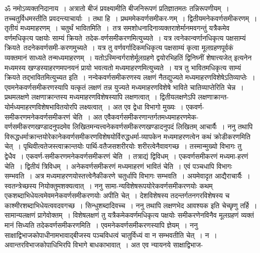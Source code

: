 \documentclass[11pt, openany]{book}
\begin{document}
\begin{sloppypar}
ॐ नमोऽव्यक्तनिदानाय~। अत्रातो बीजं प्रवक्ष्यामीति बीजनिरूपणं प्रतिज्ञातमतः तन्निरूपणीयम्~। तच्चतुर्विधमस्तीति प्रवदन्त्याचार्याः~। तथा हि~। प्रथममेकवर्णसमीकर-णम्~। द्वितीयमनेकवर्णसमीकरणम्~। तृतीयं मध्यमाहरणम्~। चतुर्थं भावितमिति~।~तत्र समशोधनादिनाव्यक्तराशेर्मानमवगन्तुं यत्रैकमेव वर्णमधिकृत्य पक्षयोः साम्यं क्रियते~तदेक-वर्णसमीकरणमित्युच्यते~। यत्र त्वनेकान्वर्णानधिकृत्य पक्षसाम्यं क्रियते~तदनेकवर्णसमी-करणमुच्यते~। यत्र तु वर्णवर्गादिकमधिकृत्य पक्षसाम्यं कृत्वा मूलग्रहणपूर्वकं व्यक्तमानं साध्यते तन्मध्यमाहरणम्~। यतोऽस्मिन्वर्गराशेर्मूलग्रहणे द्वयोरभिहतिं द्विनिघ्नीं शेषात्त्यजेत् इत्यनेन मध्यमस्य खण्डस्याहरणमपनयनं प्रायो भवत्यतो मध्यमाहरणमित्युच्यते~। यत्र तु भावितमधिकृत्य साम्यं क्रियते तद्भावितमित्युच्यत इति~। नन्वेकवर्णसमीकरणस्य लक्षणं नैतद्युज्यते मध्यमाहरणविशेषेऽतिव्याप्तेः~। एवमनेकवर्णसमीकरणस्यापि यत्कृतं लक्षणं तन्न युज्यते मध्यमाहरणविशेषे भाविते चातिव्याप्तेरिति चेन्न~। प्रथमलक्षणे लक्षणाक्रान्तस्य मध्यमाहरणविशेषस्यापि लक्षणत्वात्~। द्वितीयलक्षणेऽपि लक्षणाक्रान्त-योर्मध्यमाहरणविशेषभावितयोरपि लक्ष्यत्वात्~। अत एव द्वेधा विभागो मुख्यः~। एकवर्ण-समीकरणमनेकवर्णसमीकरणं चेति~। अत एवैकवर्गसमीकरणान्तर्गतमध्यमाहरणमेक-वर्णसमीकरणखण्डादनुपदमेव लिखितमन्यत्त्वनेकवर्णसमीकरणखण्डादनुपदं लिखितम् आचार्यैः~। ननु तथापि विरूद्धधर्माक्रान्तयोरेकानेकवर्णसमीकरणविशेषयोर्विरुद्धधर्मा-व्यापकेन मध्यमाहरणत्वेन कथं क्रोडीकरणमिति चेत्~। पृथिवीत्वतेजस्त्वाक्रान्तयोः पार्थि-वतैजसशरीरयोः शरीरत्वेनैवावगच्छ~। तस्मान्मुख्यो विभागः तु द्वेधैव~। एकवर्ण-समीकरणमनेकवर्णसमीकरणं चेति~। तत्राद्यं द्विविधम्~। एकवर्णसमीकरणं मध्यमा-हरणं चेति~। द्वितीयं त्रिविधम्~। अनेकवर्णसमीकरणं मध्यमाहरणं भावितं चेति~। एवं पञ्चधापि विभागः सम्भवति~। अत्र मध्यमाहरणयोस्तत्त्वेनैकीकरणे चतुर्धापि विभागः सम्भवति~। अयमेवादृत आद्यैराचार्यैः~। स्वतन्त्रेच्छस्य नियोक्तुमशक्यत्वात्~। ननु सामा-न्यविशेषरूपयोरेकवर्णसमीकरणयोः कथम् एकशब्दाभिधेयत्वमेवमनेकवर्णसमीकरणयोः अपीति चेत्~। देशविशेषस्य तदन्तर्गतनगरविशेषस्य च काश्मीरशब्दाभिधेयत्ववदवगच्छ~। सिन्धुशब्दादिवच्च~। ननु तथापि लक्षणभेद आवश्यक इति चेच्छृणु तर्हि~। सामान्यलक्षणं प्रागेवोक्तम्~। विशेषलक्षणं तु यत्रैकमेकवर्णमधिकृत्य पक्षयोः समीकरणेनविनैव मूलग्रहणं व्यक्तं मानं सिध्यति तदेकवर्णसमीकरणमिति~। एवमनेकवर्णसमीकरणस्यापि ज्ञेयम्~। ननु साक्षाद्विभाजकोपाधीनामभावाद्बीजस्य पञ्चविधत्वं चातुर्विध्यं वा न सम्भवतीति चेत्~। न~। अवान्तरविभाजकोपाधिभिरपि विभागे बाधकाभावात्~। अत एव न्यायनये साक्षाद्विभाज-
\end{sloppypar}

\newpage
\end{document}
